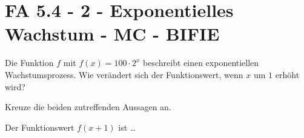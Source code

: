 \section{FA 5.4 - 2 - Exponentielles Wachstum - MC - BIFIE}

\begin{beispiel}[FA 5.4]{1} %
Die Funktion $f$ mit $f(x) = 100 \cdot 2^x$ beschreibt einen exponentiellen Wachstumsprozess. Wie verändert sich der Funktionswert, wenn $x$ um $1$ erhöht wird?

Kreuze die beiden zutreffenden Aussagen an.

Der Funktionswert $f(x+1)$ ist \ldots


\end{beispiel}